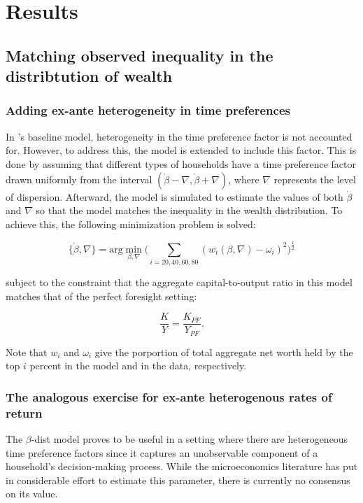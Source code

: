 \documentclass[\econtexRoot/PreproposalFinal]{subfiles}
\begin{document}
\hypertarget{Results}{}
\section{Results}\notinsubfile{\label{sec:results}}

\subsection{Matching observed inequality in the distribtution of wealth}

\subsubsection{Adding ex-ante heterogeneity in time preferences}

\par In \cite{cstw2017}'s baseline model, heterogeneity in the time preference factor is not accounted for. However, to address this, the model is extended to include this factor. This is done by assuming that different types of households have a time preference factor drawn uniformly from the interval $(\grave{\beta} - \nabla, \grave{\beta} + \nabla)$, where $\nabla$ represents the level of dispersion. Afterward, the model is simulated to estimate the values of both $\grave{\beta}$ and $\nabla$ so that the model matches the inequality in the wealth distribution. To achieve this, the following minimization problem is solved:

$$ \{\grave{\beta}, \nabla\} = \text{arg}\min_{\beta, \nabla} \bigg( \sum_{i=20, 40, 60, 80} (w_{i}(\beta, \nabla)-\omega_i )^{2} \bigg)^{\frac{1}{2}} $$

\par subject to the constraint that the aggregate capital-to-output ratio in this model matches that of the perfect foresight setting:

$$ \frac{K}{Y} = \frac{K_{PF}}{Y_{PF}}. $$

\par Note that $w_i$ and $\omega_i$ give the porportion of total aggregate net worth held by the top $i$ percent in the model and in the data, respectively.

\subsubsection{The analogous exercise for ex-ante heterogenous rates of return}

\par The $\beta$-dist model proves to be useful in a setting where there are heterogeneous time preference factors since it captures an unobservable component of a household's decision-making process. While the microeconomics literature has put in considerable effort to estimate this parameter, there is currently no consensus on its value.
\end{document}
